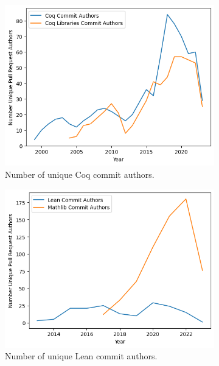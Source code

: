 \documentclass[sigconf,nonacm]{acmart}
\begin{document}
\begin{figure}[H]
  \begin{subfigure}{\columnwidth}
    \includegraphics[scale=0.5]{coq_commit_authors.png}
    \caption{Number of unique Coq commit authors.}
  \end{subfigure}
  \begin{subfigure}{\columnwidth}
    \includegraphics[scale=0.5]{lean_commits_authors.png}
    \caption{Number of unique Lean commit authors.}
  \end{subfigure}
  \begin{subfigure}{\columnwidth}

\end{subfigure}
\end{figure}
\end{document}
